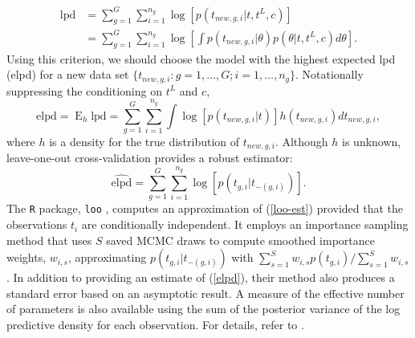 \documentclass[12pt]{article}
\newcommand{\op}{\operatorname}
\begin{document}
\begin{align*}
\mbox{lpd} &= \sum_{g=1}^G \sum_{i=1}^{n_g} \log[p(t_{new,g,i}|t, t^L, c)] \\
&= \sum_{g=1}^G \sum_{i=1}^{n_g} \log \left[ \int p(t_{new,g, i}|\theta) p(\theta|t,t^L,c) d\theta \right].
\end{align*}
\noindent Using this criterion, we should choose the model with the highest expected lpd (elpd) for a new data set $\{t_{new,g,i}:g=1,\ldots,G; i=1,\ldots,n_g\}$. Notationally suppressing the conditioning on $t^L$ and $c$,
\begin{equation}
\mbox{elpd} = \op{E}_h \mbox{lpd} = \sum_{g=1}^G \sum_{i=1}^{n_g} \int \log [p(t_{new, g, i}|t)] h(t_{new,g,i}) d t_{new,g,i},
\label{elpd}
\end{equation}
where $h$ is a density for the true distribution of $t_{new,g,i}$. Although $h$ is unknown, leave-one-out cross-validation provides a robust estimator:
\begin{equation}
\widehat{\text{elpd}} = \sum_{g=1}^G \sum_{i=1}^{n_g} \log [p(t_{g,i}|t_{-(g,i)})].
\label{loo-est}
\end{equation}
The \texttt{R} package, \texttt{loo} \citep{loo}, computes an approximation of (\ref{loo-est}) provided that the observations $t_i$ are conditionally independent. It employs an importance sampling method that uses $S$ saved MCMC draws to compute smoothed importance weights, $w_{i,s}$, approximating $p(t_{g,i}|t_{-(g,i)})$ with $\sum_{s=1}^S w_{i,s} p(t_{g,i})/\sum_{s=1}^S w_{i,s}$. In addition to providing an estimate of (\ref{elpd}), their method also produces a standard error based on an asymptotic result.  A measure of the effective number of parameters is also available using the sum of the posterior variance of the log predictive density for each observation.  For details, refer to \cite{vehtari}.
\end{document}
